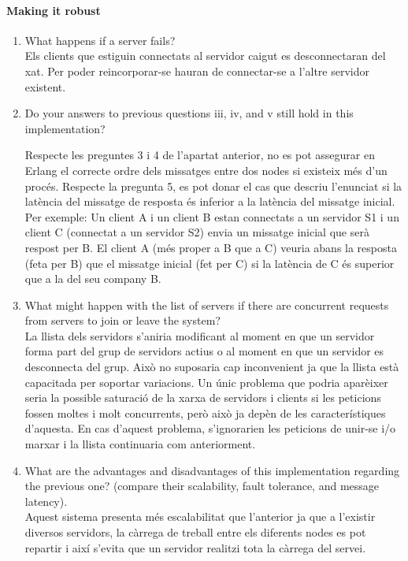 \documentclass[a4paper, 10pt]{article}
\begin{document}
\paragraph[bold]{Making it robust}
\begin{enumerate}
\item 
What happens if a server fails?\\
Els clients que estiguin connectats al servidor caigut es desconnectaran del xat. Per poder reincorporar-se hauran de connectar-se a l’altre servidor existent.

\item
Do your answers to previous questions iii, iv, and v still hold in this implementation?

Respecte les preguntes 3 i 4 de l’apartat anterior, no es pot assegurar en Erlang el correcte ordre dels missatges entre dos nodes si existeix més d’un procés. Respecte la pregunta 5, es pot donar el cas que descriu l’enunciat si la latència del missatge de resposta és inferior a la latència del missatge inicial. Per exemple: Un client A i un client B estan connectats a un servidor S1 i un client C (connectat a un servidor S2) envia un missatge inicial que serà respost per B. El client A (més proper a B que a C) veuria abans la resposta (feta per B) que el missatge inicial (fet per C) si la latència de C és superior que a la del seu company B.
\item
What might happen with the list of servers if there are concurrent requests from servers to join or leave the system?\\
La llista dels servidors s’aniria modificant al moment en que un servidor forma part del grup de servidors actius o al moment en que un servidor es desconnecta del grup. Això no suposaria cap inconvenient ja que la llista està capacitada per soportar variacions. Un únic problema que podria aparèixer seria la possible saturació de la xarxa de servidors i clients si les peticions fossen moltes i molt concurrents, però això ja depèn de les característiques d’aquesta. En cas d’aquest problema, s’ignorarien les peticions de unir-se i/o marxar i la llista continuaria com anteriorment. 
\newpage
\item
What are the advantages and disadvantages of this implementation regarding the previous one? (compare their scalability, fault tolerance, and message latency).\\
Aquest sistema presenta més escalabilitat que l’anterior ja que a l’existir diversos servidors, la càrrega de treball entre els diferents nodes es pot repartir i així s’evita que un servidor realitzi tota la càrrega del servei.

\end{enumerate}
\end{document}
